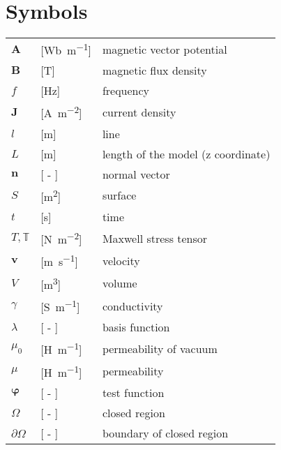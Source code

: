 \newpage
\section*{Symbols}

\begin{flushleft}
\begin{tabular}{lll}
$\bm{A}$ & [\si[inter-unit-product = \ensuremath{{}\cdot{}}]{\weber\per\metre}]& magnetic vector potential \\ 
$\bm{B}$ & [\si{\tesla}]& magnetic flux density \\
$f$ & [\si{\hertz}]& frequency \\
$\bm{J}$ & [\si[inter-unit-product = \ensuremath{{}\cdot{}}]{\ampere\per\square\metre}]& current density \\
$l$ & [\si[inter-unit-product = \ensuremath{{}\cdot{}}]{\metre}]& line \\
$L$ & [\si[inter-unit-product = \ensuremath{{}\cdot{}}]{\meter}]& length of the model (z coordinate) \\
$\bm{n}$ & [ - ]& normal vector \\
$S$ & [\si[inter-unit-product = \ensuremath{{}\cdot{}}]{\square\metre}]& surface \\
$t$ & [\si{\second}]& time \\
$T, \mathbb{T}$ & [\si[inter-unit-product = \ensuremath{{}\cdot{}}]{\newton\per\square\metre}]& Maxwell stress tensor \\ 
$\bm{v}$ & [\si[inter-unit-product = \ensuremath{{}\cdot{}}]{\metre\per\second}]& velocity \\
$V$ & [\si[inter-unit-product = \ensuremath{{}\cdot{}}]{\cubic\metre}]& volume \\

$\gamma$ & [\si[inter-unit-product = \ensuremath{{}\cdot{}}]{\siemens\per\metre}]& conductivity \\
$\lambda$ & [ - ]& basis function \\
$\mu_0$ & [\si[inter-unit-product = \ensuremath{{}\cdot{}}]{\henry\per\meter}]& permeability of vacuum \\
$\mu$ & [\si[inter-unit-product = \ensuremath{{}\cdot{}}]{\henry\per\meter}]& permeability \\
$\bm{\varphi}$ & [ - ]& test function \\
$\Omega$ & [ - ]& closed region \\
$\partial\Omega$ & [ - ]& boundary of closed region \\





\end{tabular}
\end{flushleft}